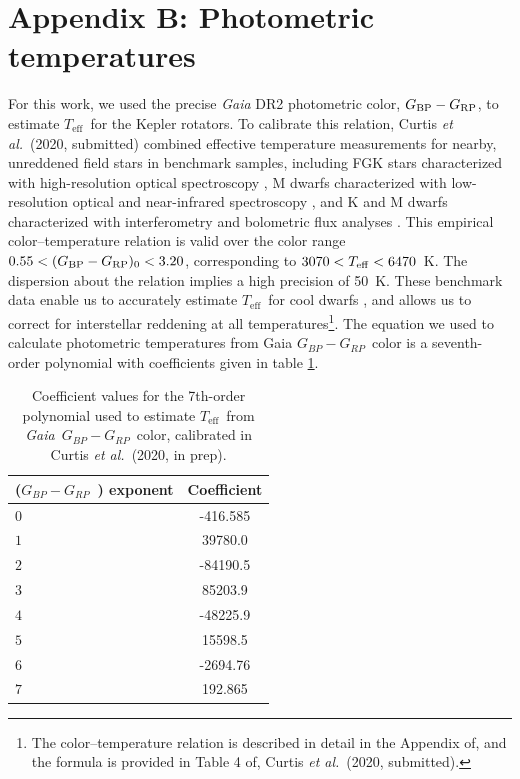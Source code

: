 \documentclass{aastex63}
\newcommand{\eg}{{\it e.g.}}
\newcommand{\etal}{{\it et al.}}
\newcommand{\Gaia}{{\it Gaia}}
\newcommand{\teff}{$T_{\mathrm{eff}}$}
\newcommand{\gcolor}{$G_{BP} - G_{RP}$}
\newcommand{\racomment}[1]{{\color{black}#1}}
\begin{document}
\racomment{
\section{Appendix B: Photometric temperatures}

For this work, we used the precise \textit{Gaia} DR2 photometric color,
$G_{\rm BP} - G_{\rm RP}$, to estimate \teff\ for the Kepler rotators.
To calibrate this relation, Curtis \etal\ (2020, submitted) combined effective
temperature measurements for nearby, unreddened field stars in benchmark
samples, including FGK stars characterized with high-resolution optical
spectroscopy \citep{brewer2016}, M dwarfs characterized with low-resolution
optical and near-infrared spectroscopy \citep{mann2015}, and K and M dwarfs
characterized with interferometry and bolometric flux analyses
\citep{boyajian2012}.
This empirical color--temperature relation is valid over the color range $0.55
< (G_{\rm BP} - G_{\rm RP})_0 < 3.20$, corresponding to $3070 < T_{\rm eff} <
6470$~K.
The dispersion about the relation implies a high precision of 50~K.
These benchmark data enable us to accurately estimate \teff\ for cool dwarfs
\citep[\eg][]{rabus2019}, and allows us to correct for interstellar reddening
at all temperatures\footnote{The color--temperature relation is described in
detail in the Appendix of, and the formula is provided in Table 4 of, Curtis
\etal\ (2020, submitted).}.
The equation we used to calculate photometric temperatures from Gaia \gcolor\
color is a seventh-order polynomial with coefficients given in table
\ref{tab:coeffs}.
\begin{table}[h!]
  \begin{center}
      \caption{
          Coefficient values for the 7th-order polynomial used to estimate
      \teff\ from \Gaia\ \gcolor\ color, calibrated in Curtis \etal\ (2020, in
      prep).}
    \label{tab:coeffs}
    \begin{tabular}{l|c} %
        (\gcolor\ ) exponent & Coefficient  \\
      \hline
      $0$ & -416.585 \\
      $1$ & 39780.0  \\
      $2$ & -84190.5 \\
      $3$ & 85203.9  \\
      $4$ & -48225.9 \\
      $5$ & 15598.5  \\
      $6$ & -2694.76 \\
      $7$ & 192.865  \\
    \end{tabular}
  \end{center}
\end{table}
}
\end{document}
